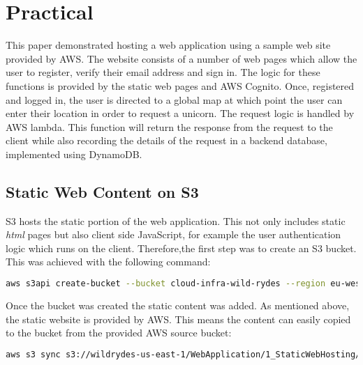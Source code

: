 \section{Practical}
  This paper demonstrated hosting a web application using a sample web site provided by AWS. The website consists of a number of web pages which allow the user to register, verify their email address and sign in. The logic for these functions is provided by the static web pages and AWS Cognito. Once, registered and logged in, the user is directed to a global map at which point the user can enter their location in order to request a unicorn. The request logic is handled by AWS lambda. This function will return the response from the request to the client while also recording the details of the request in a backend database, implemented using DynamoDB. 
  

  \subsection{Static Web Content on S3}
  S3 hosts the static portion of the web application. This not only includes static \textit{html} pages but also client side JavaScript, for example the user authentication logic which runs on the client. Therefore,the first step was to create an S3 bucket. This was achieved with the following command:
  
  \noindent\begin{minipage}{\textwidth}
    \begin{lstlisting}[caption={Create Bucket},label=create-bucket,language=bash]
    aws s3api create-bucket --bucket cloud-infra-wild-rydes --region eu-west-1 --region eu-west-1 --create-bucket-configuration LocationConstraint=eu-west-1
    \end{lstlisting}
  \end{minipage}
  
  \noindent Once the bucket was created the static content was added. As mentioned above, the static website is provided by AWS. This means the content can easily copied to the bucket from the provided AWS source bucket:
  
  \noindent\begin{minipage}{\textwidth}
    \begin{lstlisting}[caption={Adding Static Content to S3 Bucket},label=populate-bucket,language=bash]
    aws s3 sync s3://wildrydes-us-east-1/WebApplication/1_StaticWebHosting/website s3://cloud-infra-wild-rydes --region eu-west-1
    \end{lstlisting}
  \end{minipage}
  
